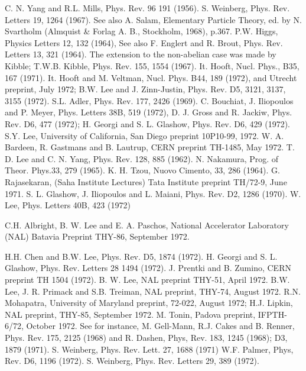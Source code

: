 \begin{thebibliography}{99}
\bibitem{} C. N. Yang and R.L. Mills, Phys. Rev. 96 191 (1956).
\bibitem{} S. Weinberg, Phys. Rev. Letters 19, 1264 (1967). See also A. Salam, Elementary Particle Theory, ed. by N. Svartholm (Almquist \& Forlag A. B., Stockholm, 1968), p.367.
\bibitem{} P.W. Higgs, Physics Letters 12, 132 (1964), See also F. Englert and R. Brout, Phys. Rev. Letters 13, 321 (1964). The extension to the non-abelian case was made by Kibble; T.W.B. Kibble, Phys. Rev. 155, 1554 (1967).
\bibitem{} It. Hooft, Nucl. Phys., B35, 167 (1971).
\bibitem{} It. Hooft and M. Veltman, Nucl. Phys. B44, 189 (1972), and Utrecht preprint, July 1972; B.W. Lee and J. Zinn-Justin, Phys. Rev. D5, 3121, 3137, 3155 (1972).
\bibitem{} S.L. Adler, Phys. Rev. 177, 2426 (1969).
\bibitem{} C. Bouchiat, J. Iliopoulos and P. Meyer, Phys. Letters 38B, 519 (1972), D. J. Gross and R. Jackiw, Phys. Rev. D6, 477 (1972); H. Georgi and S. L. Glashow, Phys. Rev. D6, 429 (1972).
\bibitem{} S.Y. Lee, University of California, San Diego preprint 10P10-99, 1972.
\bibitem{} W. A. Bardeen, R. Gastmans and B. Lautrup, CERN preprint TH-1485, May 1972.
\bibitem{} T. D. Lee and C. N. Yang, Phys. Rev. 128, 885 (1962).
\bibitem{} N. Nakamura, Prog. of Theor. Phys.33, 279 (1965). K. H. Tzou, Nuovo Cimento, 33, 286 (1964).
\bibitem{} G. Rajasekaran, (Saha Institute Lectures) Tata Institute preprint TH/72-9, June 1971.
\bibitem{} S. L. Glashow, J. Iliopoulos and L. Maiani, Phys. Rev. D2, 1286 (1970).
\bibitem{} W. Lee, Phys. Letters 40B, 423 (1972)

C.H. Albright, B. W. Lee and E. A. Paschos, National Accelerator Laboratory (NAL) Batavia Preprint THY-86, September 1972.

H.H. Chen and B.W. Lee, Phys. Rev. D5, 1874 (1972).
\bibitem{} H. Georgi and S. L. Glashow, Phys. Rev. Letters 28 1494 (1972).
\bibitem{} J. Prentki and B. Zumino, CERN preprint TH 1504 (1972).
\bibitem{} B. W. Lee, NAL preprint THY-51, April 1972.
\bibitem{} B.W. Lee, J. R. Primack and S.B. Treiman, NAL preprint, THY-74, August 1972.
\bibitem{} R.N. Mohapatra, University of Maryland preprint, 72-022, August 1972; H.J. Lipkin, NAL preprint, THY-85, September 1972.
\bibitem{} M. Tonin, Padova preprint, IFPTH-6/72, October 1972.
\bibitem{} See for instance, M. Gell-Mann, R.J. Cakes and B. Renner, Phys. Rev. 175, 2125 (1968) and R. Dashen, Phys, Rev. 183, 1245 (1968); D3, 1879 (1971).
\bibitem{} S. Weinberg, Phys. Rev. Lett. 27, 1688 (1971)
W.F. Palmer, Phys, Rev. D6,  1196 (1972).
\bibitem{} S. Weinberg, Phys. Rev. Letters 29, 389 (1972).
\end{thebibliography}












 





  




